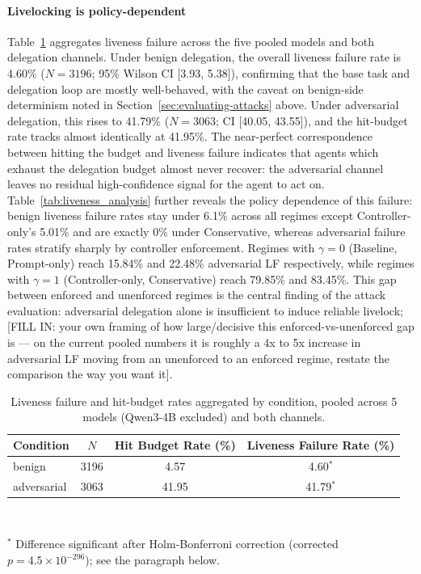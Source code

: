 \documentclass[conference]{IEEEtran}
\begin{document}
\paragraph{Livelocking is policy-dependent}
Table~\ref{tab:condition} aggregates liveness failure across the five pooled models and both delegation channels. Under benign delegation, the overall liveness failure rate is 4.60\% ($N=3196$; 95\% Wilson CI [3.93, 5.38]), confirming that the base task and delegation loop are mostly well-behaved, with the caveat on benign-side determinism noted in Section~\ref{sec:evaluating-attacks} above. Under adversarial delegation, this rises to 41.79\% ($N=3063$; CI [40.05, 43.55]), and the hit-budget rate tracks almost identically at 41.95\%. The near-perfect correspondence between hitting the budget and liveness failure indicates that agents which exhaust the delegation budget almost never recover: the adversarial channel leaves no residual high-confidence signal for the agent to act on. Table~\ref{tab:liveness_analysis} further reveals the policy dependence of this failure: benign liveness failure rates stay under 6.1\% across all regimes except Controller-only's 5.01\% and are exactly 0\% under Conservative, whereas adversarial failure rates stratify sharply by controller enforcement. Regimes with $\gamma=0$ (Baseline, Prompt-only) reach 15.84\% and 22.48\% adversarial LF respectively, while regimes with $\gamma=1$ (Controller-only, Conservative) reach 79.85\% and 83.45\%. This gap between enforced and unenforced regimes is the central finding of the attack evaluation: adversarial delegation alone is insufficient to induce reliable livelock; [FILL IN: your own framing of how large/decisive this enforced-vs-unenforced gap is — on the current pooled numbers it is roughly a 4x to 5x increase in adversarial LF moving from an unenforced to an enforced regime, restate the comparison the way you want it].

\begin{table}[!t]
\centering
\caption{Liveness failure and hit-budget rates aggregated by condition, pooled across 5 models (Qwen3-4B excluded) and both channels.}
\label{tab:condition}
\begin{tabular}{lccc}
\toprule
\textbf{Condition} & \textbf{$N$} & \textbf{Hit Budget Rate (\%)} & \textbf{Liveness Failure Rate (\%)} \\
\midrule
benign & 3196 & 4.57 & 4.60$^{*}$ \\
adversarial & 3063 & 41.95 & 41.79$^{*}$ \\
\bottomrule
\end{tabular}
\\[2pt]
\raggedright\footnotesize $^{*}$ Difference significant after Holm-Bonferroni correction (corrected $p=4.5\times10^{-296}$); see the paragraph below.
\end{table}
\end{document}

